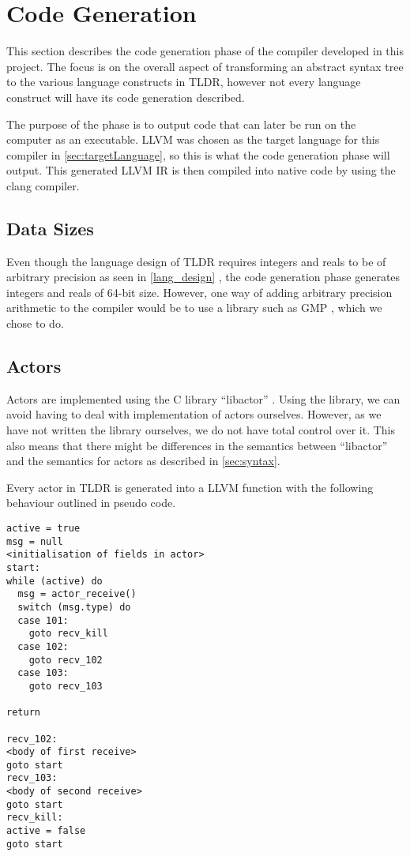 \section{Code Generation}

This section describes the code generation phase of the compiler developed in this project. The focus is on the overall aspect of transforming an abstract syntax tree to the various language constructs in TLDR, however not every language construct will have its code generation described. 

The purpose of the phase is to output code that can later be run on the computer as an executable. LLVM was chosen as the target language for this compiler in \cref{sec:targetLanguage}, so this is what the code generation phase will output. This generated LLVM IR is then compiled into native code by using the clang compiler.

\subsection{Data Sizes}

Even though the language design of TLDR requires integers and reals to be of arbitrary precision as seen in \cref{lang_design} , the code generation phase generates integers and reals of 64-bit size. However, one way of adding arbitrary precision arithmetic to the compiler would be to use a library such as GMP \cite{gmp}, which we chose to do.

\subsection{Actors}

Actors are implemented using the C library \enquote{libactor} \cite{libactor}. Using the library, we can avoid having to deal with implementation of actors ourselves. However, as we have not written the library ourselves, we do not have total control over it. This also means that there might be differences in the semantics between \enquote{libactor} and the semantics for actors as described in \cref{sec:syntax}.

Every actor in TLDR is generated into a LLVM function with the following behaviour outlined in pseudo code.

\begin{lstlisting}[breaklines]
active = true
msg = null
<initialisation of fields in actor>
start:
while (active) do
  msg = actor_receive()
  switch (msg.type) do
  case 101:
    goto recv_kill
  case 102:
    goto recv_102
  case 103:
    goto recv_103

return

recv_102:
<body of first receive>
goto start 
recv_103:
<body of second receive>
goto start 
recv_kill:
active = false
goto start
\end{lstlisting}

